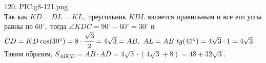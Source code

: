 120. {{PIC:g8-121.png}}\\
Так как $KD=DL=KL,$ треугольник $KDL$ является правильным и все его углы равны по $60^\circ,$ тогда $\angle KDC=90^\circ-60^\circ=30^\circ$ и $CD=KD\cos(30^\circ)=8\cdot\cfrac{\sqrt{3}}{2}=4\sqrt{3}=AB,\ AL=AB\ tg(45^\circ)=4\sqrt{3}\cdot1=4\sqrt{3}.$ Таким образом, $S_{ABCD}=AB\cdot AD=4\sqrt{3}\cdot(4\sqrt{3}+8)=48+32\sqrt{3}.$\\
